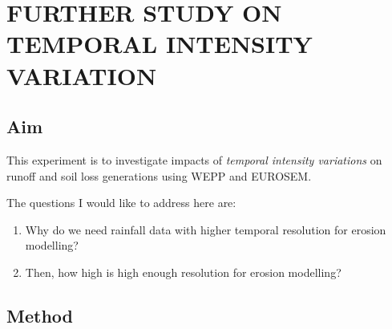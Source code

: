 \chapter{FURTHER STUDY ON TEMPORAL INTENSITY VARIATION}
\label{chap:bp2bpvariationchapter}

\section{Aim}
\label{sec:Aim}
This experiment is to investigate impacts of \emph{temporal intensity
variations} on runoff and soil loss generations using WEPP and EUROSEM.

The questions I would like to address here are:
\begin{enumerate}
  \item Why do we need rainfall data with higher temporal resolution for erosion
modelling?
  \item Then, how high is high enough resolution for erosion modelling?
\end{enumerate}

\section{Method}
\label{sec:Method}

